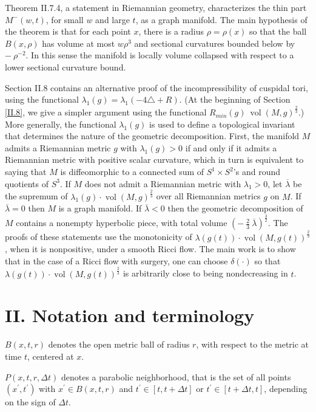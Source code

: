 \documentclass[12pt]{amsart}
\newcommand{\vol}{\operatorname{vol}}
\numberwithin{equation}{section}
\theoremstyle{plain}
\theoremstyle{definition}
\theoremstyle{remark}
\begin{document}
Theorem II.7.4, a statement in Riemannian geometry, 
characterizes the thin part $M^-(w,t)$, for small $w$ and
large $t$, as a graph manifold.  The main hypothesis of the theorem
is that for each point $x$, there is a radius $\rho = \rho(x)$
so that the ball $B(x,\rho)$ has volume at most $w \rho^3$ and
sectional curvatures bounded below by $- \: \rho^{-2}$. In this
sense the manifold is locally volume collapsed with respect to a lower
sectional curvature bound. 

Section II.8 contains an alternative proof of the incompressibility
of cuspidal tori, using the functional $\lambda_1(g) = 
\lambda_1(-4 \triangle + R)$. 
(At the beginning of Section \ref{II.8}, we give a simpler argument
using the functional $R_{min}(g) \: \vol(M,g)^{\frac23}$.)
More generally, the functional $\lambda_1(g)$ is
used to define a topological invariant that determines the nature
of the geometric decomposition. First, the manifold $M$ admits a
Riemannian metric $g$ with $\lambda_1(g) > 0$ if and only if it
admits a Riemannian metric with positive scalar curvature, which
in turn is equivalent to saying that $M$ is diffeomorphic to a
connected sum of $S^1 \times S^2$'s and round quotients of
$S^3$. If $M$ does not admit a Riemannian metric with
$\lambda_1 > 0$, let $\overline{\lambda}$ be the supremum of
$\lambda_1(g) \cdot \vol(M, g)^{\frac23}$ over all Riemannian metrics $g$
on $M$. If $\overline{\lambda} = 0$ then $M$ is a graph manifold.
If $\overline{\lambda} < 0$ then the geometric decomposition of $M$
contains a nonempty hyperbolic piece, with total volume
$\left( - \: \frac23 \: \overline{\lambda} \right)^{\frac32}$. The proofs
of these statements use the monotonicity of
$\lambda(g(t)) \cdot \vol(M, g(t))^{\frac23}$, when it is nonpositive,
under a smooth Ricci flow. The main work is to show
that in the case of a Ricci flow with surgery, one can choose $\delta(\cdot)$
so that $\lambda(g(t)) \cdot \vol(M, g(t))^{\frac23}$ is
arbitrarily close to being nondecreasing in $t$.

\section{II. Notation and terminology}
\label{notationterminology}

$B(x,t,r)$ denotes the open metric ball of radius $r$, with respect to the metric
at time $t$, centered at $x$.

$P(x,t,r, \Delta t)$ denotes a parabolic neighborhood, that is the set of
all points $(x^\prime, t^\prime)$ with $x^\prime \in B(x,t,r)$ and
$t^\prime \in [t, t+\Delta t]$ or $t^\prime \in [t+\Delta t, t]$, depending on
the sign of $\Delta t$.
\end{document}
